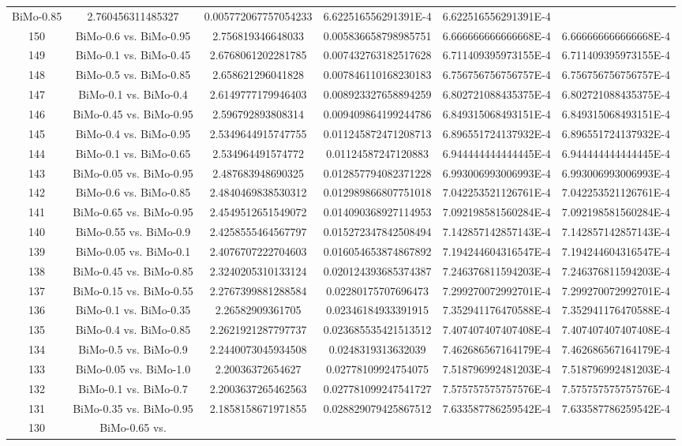 \documentclass[a4paper,10pt]{article}
\begin{document}
\begin{landscape}
\begin{table}[!htp]
\begin{tabular}{cccccc}
BiMo-0.85&2.760456311485327&0.005772067757054233&6.622516556291391E-4&6.622516556291391E-4\\150&BiMo-0.6 vs. BiMo-0.95&2.756819346648033&0.005836658798985751&6.666666666666668E-4&6.666666666666668E-4\\149&BiMo-0.1 vs. BiMo-0.45&2.6768061202281785&0.007432763182517628&6.711409395973155E-4&6.711409395973155E-4\\148&BiMo-0.5 vs. BiMo-0.85&2.658621296041828&0.007846110168230183&6.756756756756757E-4&6.756756756756757E-4\\147&BiMo-0.1 vs. BiMo-0.4&2.6149777179946403&0.008923327658894259&6.802721088435375E-4&6.802721088435375E-4\\146&BiMo-0.45 vs. BiMo-0.95&2.596792893808314&0.009409864199244786&6.849315068493151E-4&6.849315068493151E-4\\145&BiMo-0.4 vs. BiMo-0.95&2.5349644915747755&0.011245872471208713&6.896551724137932E-4&6.896551724137932E-4\\144&BiMo-0.1 vs. BiMo-0.65&2.534964491574772&0.01124587247120883&6.944444444444445E-4&6.944444444444445E-4\\143&BiMo-0.05 vs. BiMo-0.95&2.487683948690325&0.012857794082371228&6.993006993006993E-4&6.993006993006993E-4\\142&BiMo-0.6 vs. BiMo-0.85&2.4840469838530312&0.012989866807751018&7.042253521126761E-4&7.042253521126761E-4\\141&BiMo-0.65 vs. BiMo-0.95&2.4549512651549072&0.014090368927114953&7.092198581560284E-4&7.092198581560284E-4\\140&BiMo-0.55 vs. BiMo-0.9&2.4258555464567797&0.015272347842508494&7.142857142857143E-4&7.142857142857143E-4\\139&BiMo-0.05 vs. BiMo-0.1&2.4076707222704603&0.016054653874867892&7.194244604316547E-4&7.194244604316547E-4\\138&BiMo-0.45 vs. BiMo-0.85&2.3240205310133124&0.020124393685374387&7.246376811594203E-4&7.246376811594203E-4\\137&BiMo-0.15 vs. BiMo-0.55&2.2767399881288584&0.02280175707696473&7.299270072992701E-4&7.299270072992701E-4\\136&BiMo-0.1 vs. BiMo-0.35&2.26582909361705&0.02346184933391915&7.352941176470588E-4&7.352941176470588E-4\\135&BiMo-0.4 vs. BiMo-0.85&2.2621921287797737&0.023685535421513512&7.407407407407408E-4&7.407407407407408E-4\\134&BiMo-0.5 vs. BiMo-0.9&2.2440073045934508&0.0248319313632039&7.462686567164179E-4&7.462686567164179E-4\\133&BiMo-0.05 vs. BiMo-1.0&2.20036372654627&0.02778109924754075&7.518796992481203E-4&7.518796992481203E-4\\132&BiMo-0.1 vs. BiMo-0.7&2.2003637265462563&0.027781099247541727&7.575757575757576E-4&7.575757575757576E-4\\131&BiMo-0.35 vs. BiMo-0.95&2.1858158671971855&0.028829079425867512&7.633587786259542E-4&7.633587786259542E-4\\130&BiMo-0.65 vs. 
\end{tabular}
\end{table}
\end{landscape}
\end{document}
